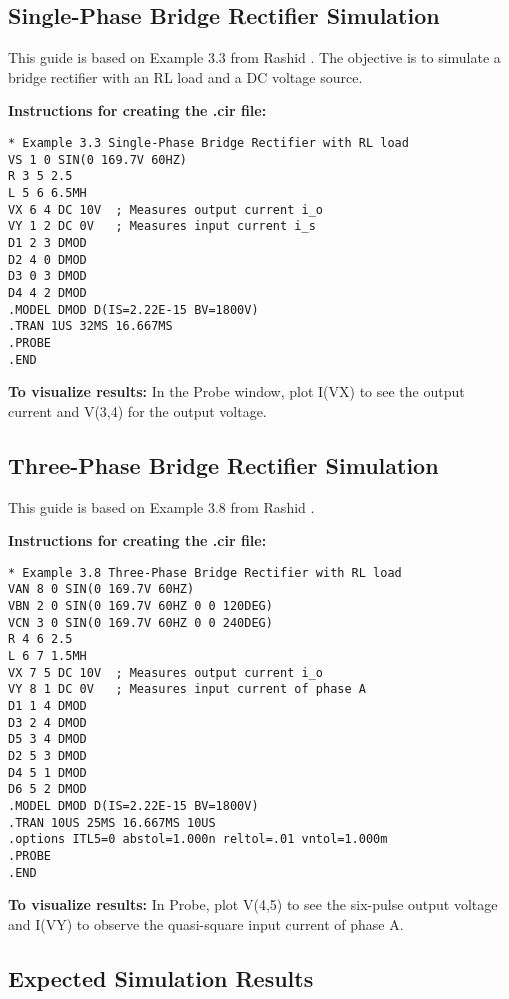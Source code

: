 \documentclass[12pt,a4paper]{article}
\begin{document}
\subsection{Single-Phase Bridge Rectifier Simulation}

This guide is based on Example 3.3 from Rashid \cite{rashid2014}. The objective is to simulate a bridge rectifier with an RL load and a DC voltage source.

\textbf{Instructions for creating the .cir file:}

\begin{lstlisting}[caption=Single-Phase Bridge Rectifier PSpice Code]
* Example 3.3 Single-Phase Bridge Rectifier with RL load
VS 1 0 SIN(0 169.7V 60HZ)
R 3 5 2.5
L 5 6 6.5MH
VX 6 4 DC 10V  ; Measures output current i_o
VY 1 2 DC 0V   ; Measures input current i_s
D1 2 3 DMOD
D2 4 0 DMOD
D3 0 3 DMOD
D4 4 2 DMOD
.MODEL DMOD D(IS=2.22E-15 BV=1800V)
.TRAN 1US 32MS 16.667MS
.PROBE
.END
\end{lstlisting}

\textbf{To visualize results:} In the Probe window, plot I(VX) to see the output current and V(3,4) for the output voltage.

\subsection{Three-Phase Bridge Rectifier Simulation}

This guide is based on Example 3.8 from Rashid \cite{rashid2014}.

\textbf{Instructions for creating the .cir file:}

\begin{lstlisting}[caption=Three-Phase Bridge Rectifier PSpice Code]
* Example 3.8 Three-Phase Bridge Rectifier with RL load
VAN 8 0 SIN(0 169.7V 60HZ)
VBN 2 0 SIN(0 169.7V 60HZ 0 0 120DEG)
VCN 3 0 SIN(0 169.7V 60HZ 0 0 240DEG)
R 4 6 2.5
L 6 7 1.5MH
VX 7 5 DC 10V  ; Measures output current i_o
VY 8 1 DC 0V   ; Measures input current of phase A
D1 1 4 DMOD
D3 2 4 DMOD
D5 3 4 DMOD
D2 5 3 DMOD
D4 5 1 DMOD
D6 5 2 DMOD
.MODEL DMOD D(IS=2.22E-15 BV=1800V)
.TRAN 10US 25MS 16.667MS 10US
.options ITL5=0 abstol=1.000n reltol=.01 vntol=1.000m
.PROBE
.END
\end{lstlisting}

\textbf{To visualize results:} In Probe, plot V(4,5) to see the six-pulse output voltage and I(VY) to observe the quasi-square input current of phase A.

\subsection{Expected Simulation Results}
\end{document}
